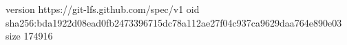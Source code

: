 version https://git-lfs.github.com/spec/v1
oid sha256:bda1922d08ead0fb2473396715dc78a112ae27f04c937ca9629daa764e890e03
size 174916
